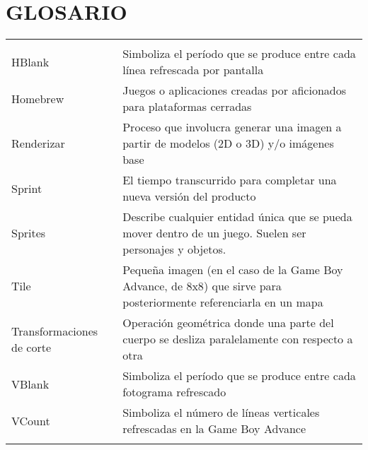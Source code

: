 \section*{GLOSARIO}

\begin{tabular}{ l   |    p{8cm}  }
	

&\\
HBlank & Simboliza el período que se produce entre cada línea refrescada por pantalla \\
Homebrew & Juegos o aplicaciones creadas por aficionados para plataformas cerradas \\
Renderizar & Proceso que involucra generar una imagen a partir de modelos (2D o 3D) y/o imágenes base \\ 
Sprint & El tiempo transcurrido para completar una nueva versión del producto \\
Sprites & Describe cualquier entidad única que se pueda mover dentro de un juego. Suelen ser personajes y objetos. \\
Tile & Pequeña imagen (en el caso de la Game Boy Advance, de 8x8) que sirve para posteriormente referenciarla en un mapa \\
Transformaciones de corte & Operación geométrica donde una parte del cuerpo se desliza paralelamente con respecto a otra \\
VBlank & Simboliza el período que se produce entre cada fotograma refrescado \\
VCount & Simboliza el número de líneas verticales refrescadas en la Game Boy Advance \\
      &\\

\end{tabular}


